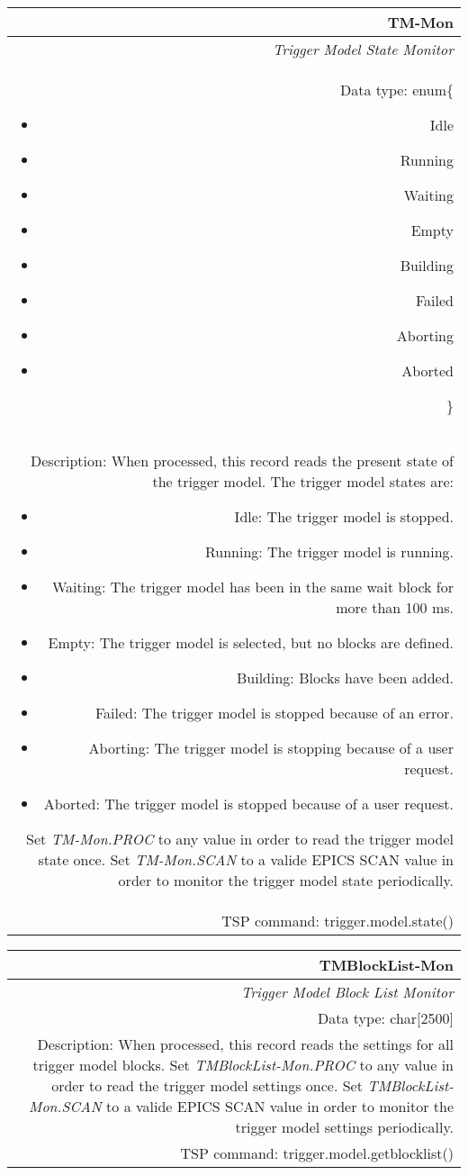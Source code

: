 \documentclass[openany]{article}
\begin{document}
		\begin{tabular}{N}
			\hline
			\bfseries TM-Mon\label{pv:tm-mon} \\ \hline
			\emph{Trigger Model State Monitor} \\
			Data type: enum\{\begin{itemize}[noitemsep]
				\small
				\item[] Idle
				\item[] Running
				\item[] Waiting
				\item[] Empty
				\item[] Building
				\item[] Failed
				\item[] Aborting
				\item[] Aborted
			\end{itemize}\} \\
			Description: When processed, this record reads the present state of the trigger model. The trigger model states are: \begin{itemize} \item Idle: The trigger model is stopped. \item Running: The trigger model is running. \item Waiting: The trigger model has been in the same wait block for more than 100 ms. \item Empty: The trigger model is selected, but no blocks are defined. \item Building: Blocks have been added. \item Failed: The trigger model is stopped because of an error. \item Aborting: The trigger model is stopping because of a user request. \item Aborted: The trigger model is stopped because of a user request. \end{itemize} Set \emph{TM-Mon.PROC} to any value in order to read the trigger model state once. Set \emph{TM-Mon.SCAN} to a valide EPICS SCAN value in order to monitor the trigger model state periodically. \\
			TSP command: trigger.model.state()
		\end{tabular}

		\begin{tabular}{N}
			\hline
			\bfseries TMBlockList-Mon\label{pv:tmblocklist-mon} \\ \hline
			\emph{Trigger Model Block List Monitor} \\
			Data type: char[2500] \\
			Description: When processed, this record reads the settings for all trigger model blocks. Set \emph{TMBlockList-Mon.PROC} to any value in order to read the trigger model settings once. Set \emph{TMBlockList-Mon.SCAN} to a valide EPICS SCAN value in order to monitor the trigger model settings periodically. \\
			TSP command: trigger.model.getblocklist()
		\end{tabular}
\end{document}
